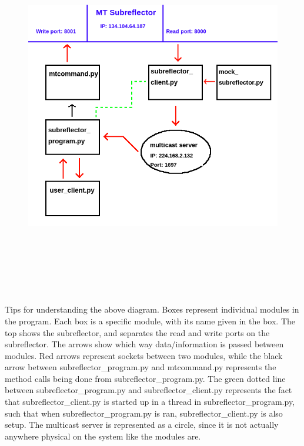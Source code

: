 \documentclass{article}
\begin{document}
 \begin{figure}[H]
\includegraphics[width=16cm, height=16cm]{program_diagram}
\centering
\end{figure}


 \vspace{10pt}

Tips for understanding the above diagram. Boxes represent individual modules in the program. Each box is a specific module, with its name given in the box. The top shows the subreflector, and separates the read and write ports on the subreflector.  The arrows show which way data/information is passed between modules. Red arrows represent sockets between two modules, while the black arrow between subreflector\_program.py and mtcommand.py represents the method calls being done from subreflector\_program.py. The green dotted line between subreflector\_program.py and subreflector\_client.py represents the fact that subreflector\_client.py is started up in a thread in subreflector\_program.py, such that when subreflector\_program.py is ran, subreflector\_client.py is also setup. The multicast server is represented as a circle, since it is not actually anywhere physical on the system like the modules are.
\end{document}
